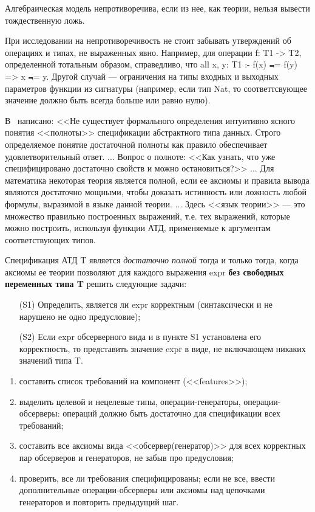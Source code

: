 
Алгебраическая модель непротиворечива, если из нее, как теории, нельзя вывести тождественную ложь.

При исследовании на непротиворечивость не стоит забывать утверждений об операциях и типах, не выраженных явно. Например, для операции f: T1 -> T2, определенной тотальным образом, справедливо, что all x, y: T1 :- f(x) $\Not$= f(y) => x $\Not$= y. Другой случай --- ограничения на типы входных и выходных параметров функции из сигнатуры (например, если тип Nat, то соответтсвующее значение должно быть всегда больше или равно нулю).


В~\cite{mayer} написано: <<Не существует формального определения интуитивно ясного понятия <<полноты>> спецификации абстрактного типа данных. Строго определяемое понятие достаточной полноты как правило обеспечивает удовлетворительный ответ. ... Вопрос о полноте: <<Как узнать, что уже специфицировано достаточно свойств и можно остановиться?>> ... Для математика некоторая теория является полной, если ее аксиомы и правила вывода являются достаточно мощными, чтобы доказать истинность или ложность любой формулы, выразимой в языке данной теории. ... Здесь <<язык теории>> --- это множество правильно построенных выражений, т.е. тех выражений, которые можно построить, используя функции АТД, применяемые к аргументам соответствующих типов.

Спецификация АТД T является \emph{достаточно полной} тогда и только тогда, когда аксиомы ее теории позволяют для каждого выражения expr \textbf{без свободных переменных типа T} решить следующие задачи:

\begin{itemize}
\item[(S1)] Определить, является ли expr корректным (синтаксически и не нарушено не одно предусловие);
\item[(S2)] Если expr обсерверного вида и в пункте S1 установлена его корректность, то представить значение expr в виде, не включающем никаких значений типа T.
\end{itemize}


\begin{enumerate}
\item составить список требований на компонент (<<features>>);
\item выделить целевой и нецелевые типы, операции-генераторы, операции-обсерверы: операций должно быть достаточно для спецификации всех требований;
\item составить все аксиомы вида <<обсервер(генератор)>> для всех корректных пар обсерверов и генераторов, не забыв про предусловия;
\item проверить, все ли требования специфицированы; если не все, ввести дополнительные операции-обсерверы или аксиомы над цепочками генераторов и повторить предыдущий шаг.
\end{enumerate}

